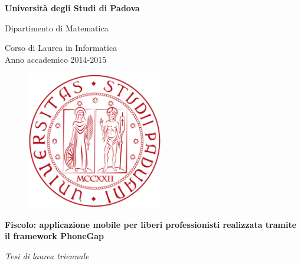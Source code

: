 \documentclass[12pt]{article}
\begin{document}
\begin{titlepage}
\begin{center}

\begin{LARGE}
\textbf{Università degli Studi di Padova} \\
\end{LARGE}

\vspace{10pt}

\begin{large}
Dipartimento di Matematica \\
\end{large}

\vspace{10pt}

\begin{large}
Corso di Laurea in Informatica \\
Anno accademico 2014-2015
\end{large}

\vspace{20pt}

\begin{figure}[htbp]
\begin{center}
\includegraphics[height=6cm]{images/logo-unipd.png}
\end{center}
\end{figure}

\vspace{0pt}

\begin{LARGE}
\begin{center}
\textbf{Fiscolo: applicazione mobile per liberi professionisti realizzata tramite
il framework PhoneGap}
\end{center}
\end{LARGE}

\vspace{5pt}

\begin{large}
\textit{Tesi di laurea triennale}
\end{large}


\end{center}
\end{titlepage}
\end{document}
